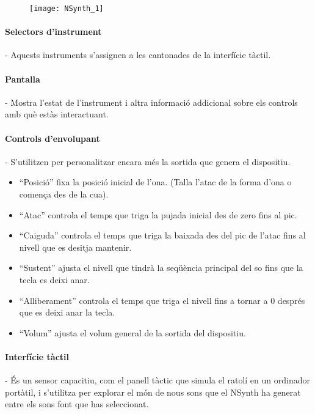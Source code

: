 \begin{figure}[h]
\centering
\texttt{[image: NSynth\_1]}
\end{figure}

\paragraph{Selectors d'instrument} - Aquests instruments s'assignen a les cantonades de la interfície tàctil.

\paragraph{Pantalla} - Mostra l'estat de l'instrument i altra informació addicional sobre els controls amb què estàs interactuant.

\paragraph{Controls d'envolupant} - S'utilitzen per personalitzar encara més la sortida que genera el dispositiu.
\begin{itemize}
\item ``Posició'' fixa la posició inicial de l'ona. (Talla l'atac de la forma d'ona o comença des de la cua).
\item ``Atac'' controla el temps que triga la pujada inicial des de zero fins al pic.
\item ``Caiguda'' controla el temps que triga la baixada des del pic de l'atac fins al nivell que es desitja mantenir.
\item ``Sustent'' ajusta el nivell que tindrà la seqüència principal del so fins que la tecla es deixi anar.
\item ``Alliberament'' controla el temps que triga el nivell fins a tornar a 0 després que es deixi anar la tecla.
\item ``Volum''  ajusta el volum general de la sortida del dispositiu.
\end{itemize}

\paragraph{Interfície tàctil} - És un sensor capacitiu, com el panell tàctic que simula el ratolí en un ordinador portàtil, i s'utilitza per explorar el món de nous sons que el NSynth ha generat entre els sons font que has seleccionat.

\vfill

